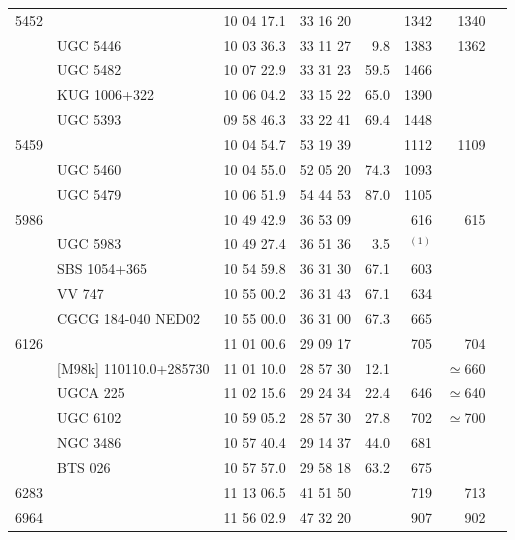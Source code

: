 \documentclass{aa}
\begin{document}
\begin{center}
\begin{table}
\begin{center}
\begin{tabular}{|c|l|c|c|r|r|r|r}
\hline
5452  &                          & 10 04 17.1 & 33 16 20   &        &   1342 &   1340\\
      & UGC 5446                 & 10 03 36.3 & 33 11 27   &   9.8  &   1383 &   1362\\
      & UGC 5482                 & 10 07 22.9 & 33 31 23   &   59.5 &   1466 & \\
      & KUG 1006+322             & 10 06 04.2 & 33 15 22   &   65.0 &   1390 & \\
      & UGC 5393                 & 09 58 46.3 & 33 22 41   &   69.4 &   1448 & \\
\hline
5459  &                          & 10 04 54.7 & 53 19 39   &        &   1112 &   1109\\
      & UGC 5460                 & 10 04 55.0 & 52 05 20   &   74.3 &   1093 & \\
      & UGC 5479                 & 10 06 51.9 & 54 44 53   &   87.0 &   1105 & \\
\hline
5986  &                          & 10 49 42.9 & 36 53 09   &        &   616  &   615\\
      & UGC 5983                 & 10 49 27.4 & 36 51 36   &   3.5  &   $^{(1)}$     & \\
      & SBS 1054+365             & 10 54 59.8 & 36 31 30   &   67.1 &   603  &   \\
      & VV 747                   & 10 55 00.2 & 36 31 43   &   67.1 &   634 & \\
      & CGCG 184-040 NED02       & 10 55 00.0 & 36 31 00   &   67.3 &   665 & \\
\hline
6126  &                          & 11 01 00.6 & 29 09 17   &        &   705  &   704\\
      & [M98k] 110110.0+285730   & 11 01 10.0 & 28 57 30   &   12.1 &        &   $\simeq$660\\
      & UGCA 225                 & 11 02 15.6 & 29 24 34   &   22.4 &   646  &   $\simeq$640\\
      & UGC 6102                 & 10 59 05.2 & 28 57 30   &   27.8 &   702  &   $\simeq$700\\
      & NGC 3486                 & 10 57 40.4 & 29 14 37   &   44.0 &   681 & \\
      & BTS 026                  & 10 57 57.0 & 29 58 18   &   63.2 &   675 & \\
\hline
6283  &                          & 11 13 06.5 & 41 51 50   &        &   719  &   713\\
\hline
6964  &                          & 11 56 02.9 & 47 32 20   &        &   907  &   902\\

\end{tabular}
\end{center}
\end{table}
\end{center}
\end{document}
